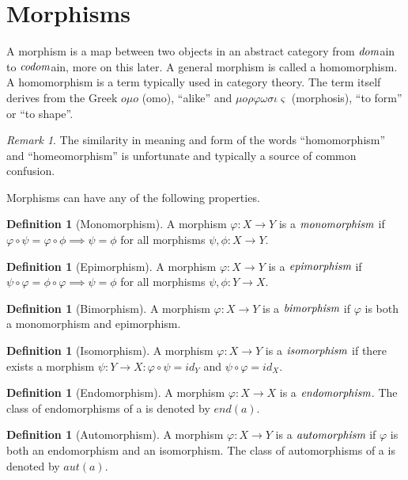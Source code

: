 \documentclass[10pt, oneside, reqno]{amsart}
\theoremstyle{plain}%
\theoremstyle{definition}
\newtheorem{defn}[thm]{Definition}
\theoremstyle{remark}
\newtheorem*{rem}{Remark}
\newcommand{\Id}{\mathit{id}_}
\begin{document}
\section{Morphisms} %
\label{sec:morphisms}
A morphism is a map between two objects in an abstract category from $\emph{dom}$ain to $\emph{codom}$ain, more on this later.
A general morphism is called a homomorphism. A homomorphism is a term typically used in category theory.
The term itself derives from the Greek $o \mu o$ (omo), ``alike'' and $\mu o \rho\varphi\omega\sigma\iota\varsigma$
(morphosis), ``to form'' or ``to shape''.
\begin{rem}
 The similarity in meaning and form of the words ``homomorphism'' and ``homeomorphism'' is unfortunate and typically
 a source of common confusion.
\end{rem}

Morphisms can have any of the following properties.

\begin{defn}[Monomorphism]
 A morphism $\varphi: X \to Y$ is a $\emph{monomorphism}$ if $\varphi \circ \psi = \varphi \circ \phi \implies \psi = \phi$ for all morphisms $\psi,\phi: X \to Y$.
\end{defn}

\begin{defn}[Epimorphism]
 A morphism $\varphi: X \to Y$ is a $\emph{epimorphism}$ if $\psi \circ \varphi = \phi \circ \varphi \implies \psi = \phi$ for all morphisms $\psi,\phi: Y \to X$.
\end{defn}
 
\begin{defn}[Bimorphism]
 A morphism $\varphi: X \to Y$ is a $\emph{bimorphism}$ if $\varphi$ is both a monomorphism and epimorphism.
\end{defn}

\begin{defn}[Isomorphism]
 A morphism $\varphi: X \to Y$ is a $\emph{isomorphism}$ if there exists a morphism $\psi: Y \to X : \varphi \circ \psi = \Id{Y}$ and $\psi \circ \varphi = \Id{X}$.
\end{defn}

\begin{defn}[Endomorphism]
 A morphism $\varphi: X \to X$ is a $\emph{endomorphism}$.
 The class of endomorphisms of a is denoted by $end(a)$.
\end{defn}

\begin{defn}[Automorphism]
 A morphism $\varphi: X \to Y$ is a $\emph{automorphism}$ if $\varphi$ is both an endomorphism and an isomorphism.
 The class of automorphisms of a is denoted by $aut(a)$.
\end{defn}
\end{document}
